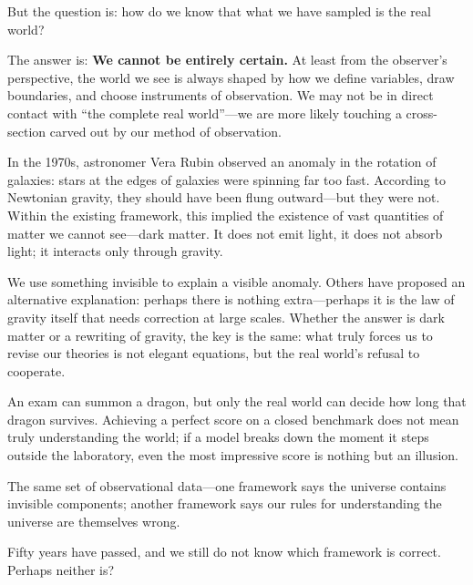 \vspace{1em}

But the question is: how do we know that what we have sampled is the real world?

The answer is: \textbf{We cannot be entirely certain.}
At least from the observer's perspective, the world we see is always shaped by how we define variables, draw boundaries, and choose instruments of observation. We may not be in direct contact with ``the complete real world''---we are more likely touching a cross-section carved out by our method of observation.

\vspace{1em}

In the 1970s, astronomer Vera Rubin observed an anomaly in the rotation of galaxies: stars at the edges of galaxies were spinning far too fast. According to Newtonian gravity, they should have been flung outward---but they were not. Within the existing framework, this implied the existence of vast quantities of matter we cannot see---dark matter. It does not emit light, it does not absorb light; it interacts only through gravity.

\vspace{1em}

We use something invisible to explain a visible anomaly. Others have proposed an alternative explanation: perhaps there is nothing extra---perhaps it is the law of gravity itself that needs correction at large scales. Whether the answer is dark matter or a rewriting of gravity, the key is the same: what truly forces us to revise our theories is not elegant equations, but the real world's refusal to cooperate.

\vspace{1em}

An exam can summon a dragon, but only the real world can decide how long that dragon survives.
Achieving a perfect score on a closed benchmark does not mean truly understanding the world; if a model breaks down the moment it steps outside the laboratory, even the most impressive score is nothing but an illusion.

\begin{thinkbox}
The same set of observational data---one framework says the universe contains invisible components; another framework says our rules for understanding the universe are themselves wrong.

Fifty years have passed, and we still do not know which framework is correct. Perhaps neither is?
\end{thinkbox}



